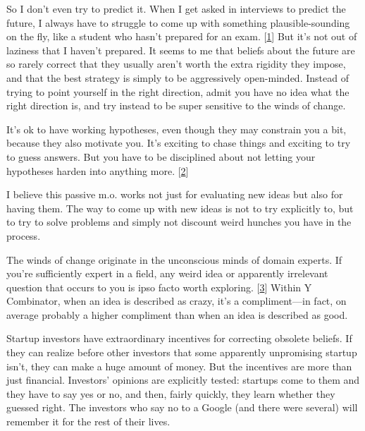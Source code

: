 So
                  I don't even try to predict it. When I get asked in interviews
                  to predict the future, I always have to struggle to come up
                  with something plausible-sounding on the fly, like a student
                  who hasn't prepared for an exam.
                  [\href{\#f1n}{1}]
                  But it's not out of laziness that I haven't prepared. It seems
                  to me that beliefs about the future are so rarely correct that
                  they usually aren't worth the extra rigidity they impose, and
                  that the best strategy is simply to be aggressively
                  open-minded. Instead of trying to point yourself in the right
                  direction, admit you have no idea what the right direction is,
                  and try instead to be super sensitive to the winds of
                  change.

It's ok to have working hypotheses, even
                  though they may constrain you a bit, because they also
                  motivate you. It's exciting to chase things and exciting to
                  try to guess answers. But you have to be disciplined about not
                  letting your hypotheses harden into anything more.
                  [\href{\#f2n}{2}]

I believe this passive m.o. works not just for
                  evaluating new ideas but also for having them. The way to come
                  up with new ideas is not to try explicitly to, but to try to
                  solve problems and simply not discount weird hunches you have
                  in the process.

The winds of change originate in
                  the unconscious minds of domain experts. If you're
                  sufficiently expert in a field, any weird idea or apparently
                  irrelevant question that occurs to you is ipso facto worth
                  exploring.
                  [\href{\#f3n}{3}]
                  Within Y Combinator, when an idea is described as crazy, it's
                  a compliment---in fact, on average probably a higher
                  compliment than when an idea is described as good.

Startup
                  investors have extraordinary incentives for correcting
                  obsolete beliefs. If they can realize before other investors
                  that some apparently unpromising startup isn't, they can make
                  a huge amount of money. But the incentives are more than just
                  financial. Investors' opinions are explicitly tested: startups
                  come to them and they have to say yes or no, and then, fairly
                  quickly, they learn whether they guessed right. The investors
                  who say no to a Google (and there were several) will remember
                  it for the rest of their lives.

